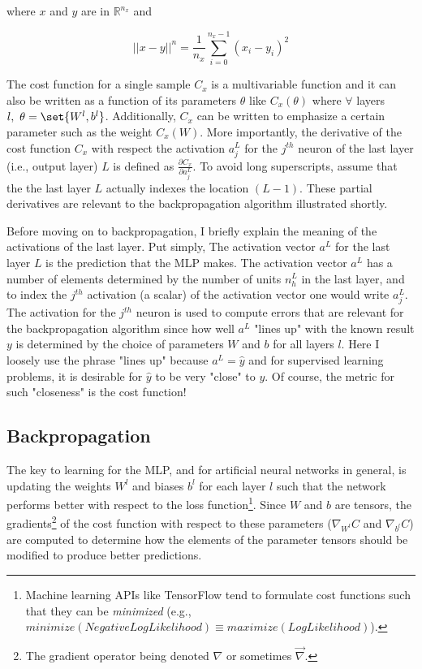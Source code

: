 \documentclass{article}
\DeclarePairedDelimiter\set\{\}
\begin{document}
where $x$ and $y$ are in $\mathbb{R}^{n_x}$ and

\begin{equation}
	||x - y||^{n} = \frac{1}{n_x} \sum_{i=0}^{n_{x}-1} { (x_{i} - y_{i})^{2} }
\end{equation}

The cost function for a single sample $C_x$ is a multivariable function
and it can also be written as a function of its parameters $\theta$ like
$C_x(\theta)$ where $\forall$ layers $l,\ \theta = \set{W^{l}, b^{l}}$. Additionally,
$C_x$ can be written to emphasize a certain parameter such as the weight $C_x(W)$.
More importantly, the derivative of the cost function $C_x$ with respect the activation
$a_j^{L}$ for the $j^{th}$ neuron of the last layer (i.e., output layer) $L$ is defined as
$\frac{\partial C_x}{\partial a_j^{L}}$. To avoid long superscripts, assume
that the the last layer $L$ actually indexes the location $(L-1)$.
These partial derivatives are relevant to the backpropagation algorithm illustrated shortly.

Before moving on to backpropagation, I briefly explain the meaning of the activations
of the last layer. Put simply, The activation vector $a^{L}$ for the last layer $L$ is the prediction
that the MLP makes. The activation vector $a^{L}$ has a number of elements
determined by the number of units $n_h^{L}$ in the last layer, and to index the $j^{th}$
activation (a scalar) of the activation vector one would write $a_j^{L}$. The activation for
the $j^{th}$ neuron is used to compute errors that are relevant for the
backpropagation algorithm since how well $a^{L}$ "lines up" with the known
result $y$ is determined by the choice of parameters $W$ and $b$ for all layers $l$.
Here I loosely use the phrase "lines up" because $a^{L} = \hat{y}$ and for supervised
learning problems, it is desirable for $\hat{y}$ to be very "close" to $y$. Of
course, the metric for such "closeness" is the cost function!

\subsection{Backpropagation}

The key to learning for the MLP, and for artificial neural networks in general,
is updating the weights $W^{l}$ and biases $b^{l}$ for each layer $l$ such
that the network performs better with respect to the loss function\footnote{
Machine learning APIs like TensorFlow tend to formulate cost functions
such that they can be \textit{minimized} (e.g.,
$minimize(NegativeLogLikelihood) \equiv maximize(LogLikelihood)$).}.
Since $W$ and $b$ are tensors, the gradients\footnote{The gradient operator
	being denoted $\nabla$ or sometimes $\vec{\nabla}$.}
of the cost function with respect to these parameters ($\nabla_{W^{l}} C$
and $\nabla_{b^{l}} C$) are computed to determine how
the elements of the parameter tensors should be modified to produce better predictions.
\end{document}
